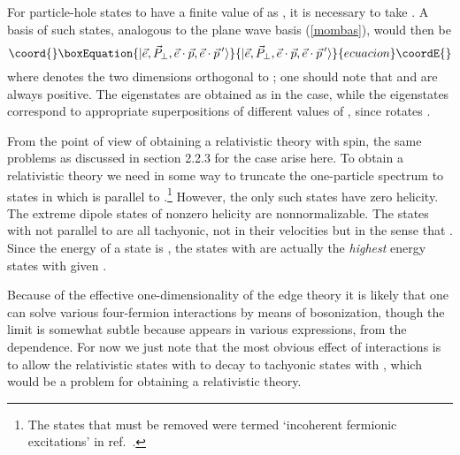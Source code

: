 \documentclass[a4paper,12pt]{article}
\begin{document}
For particle-hole states to have a finite value of \coordHE{} as \coordHE{}, it is necessary to take \coordHE{}.  A basis of such states, analogous to
the plane wave basis (\ref{mombas}), would then be
\begin{equation}\coord{}\boxEquation{
| \vec e, \vec P_\perp, \vec e \cdot \vec p,  \vec e \cdot \vec p\,' \rangle
}{
| \vec e, \vec P_\perp, \vec e \cdot \vec p,  \vec e \cdot \vec p\,' \rangle
}{ecuacion}\coordE{}\end{equation}
where \myHighlight{$\perp$}\coordHE{} denotes the two dimensions orthogonal to \coordHE{}; one should
note that \coordHE{} and \coordHE{} are always
positive.  The
\coordHE{} eigenstates are obtained as in the \coordHE{} case, while the \coordHE{}
eigenstates correspond to appropriate superpositions of different values of
\coordHE{}, since
\coordHE{} rotates \coordHE{}.

From the point of view of obtaining a relativistic theory with spin, the same
problems as discussed in section 2.2.3 for the \coordHE{} case arise here. 
To obtain a relativistic theory we need in some way to truncate the
one-particle spectrum to states in which
\coordHE{} is parallel to \coordHE{}.\footnote{The states that must be removed 
were termed `incoherent fermionic excitations' in
ref.~\cite{hz1}.}  
However, the only such states have
zero helicity.  The extreme dipole states of nonzero helicity are
nonnormalizable.  The states with  \coordHE{} not parallel to \coordHE{} are all
tachyonic, not in their velocities but in the sense that
\coordHE{}.  Since the energy of a state is \coordHE{}, the states
with \coordHE{} are actually the {\it highest} energy states
with given
\coordHE{}.

Because of the effective one-dimensionality of the edge theory it is likely
that one can solve various four-fermion interactions by means of bosonization, 
though the \coordHE{} limit is somewhat subtle because \coordHE{} appears
in various expressions, from the \coordHE{} dependence.  
For now we just note
that the most obvious effect of interactions is to allow the relativistic
states with \coordHE{} to decay to tachyonic states with \coordHE{}, which would
be a problem for obtaining a relativistic theory.
\end{document}
